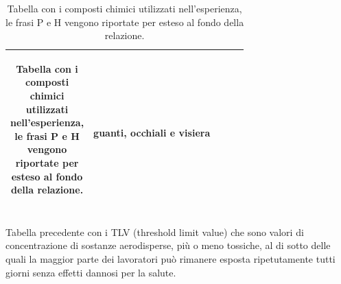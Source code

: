 \begin{table}[!ht]
\begin{tabularx}{\textwidth}{m{}|m{}|m{}|m{}|m{}}
\begin{center}
\begin{tabular}{cc}
             \end{tabular}\end{center} & guanti, occhiali e visiera\\
        \bottomrule
    \end{tabularx}
    \caption{Tabella con i composti chimici utilizzati nell'esperienza, le frasi P e H vengono riportate per esteso al fondo della relazione.} %
    \label{tab:tab1} %
    \normalsize
\end{table}

\newpage
Tabella precedente con i TLV (threshold limit value) che sono valori di concentrazione di sostanze aerodisperse, più o meno tossiche, al di sotto delle quali la maggior parte dei lavoratori può rimanere esposta ripetutamente tutti giorni senza effetti dannosi per la salute.

